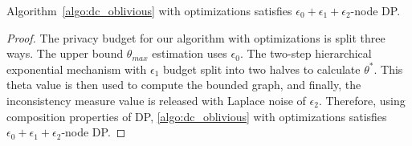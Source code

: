 \begin{theorem}\label{thm:privacy_proof_dc_aware}
    Algorithm~\ref{algo:dc_oblivious} with optimizations satisfies $\epsilon_0 + \epsilon_1 + \epsilon_2$-node DP.
\end{theorem}
\begin{proof}
    The privacy budget for our algorithm with optimizations is split three ways. The upper bound $\theta_{max}$ estimation uses $\epsilon_0$. The two-step hierarchical exponential mechanism with $\epsilon_1$ budget split into two halves to calculate $\theta^*$. This theta value is then used to compute the bounded graph, and finally, the inconsistency measure value is released with Laplace noise of $\epsilon_2$. Therefore, using composition properties of DP, \cref{algo:dc_oblivious} with optimizations satisfies $\epsilon_0 + \epsilon_1 + \epsilon_2$-node DP.
\end{proof}

